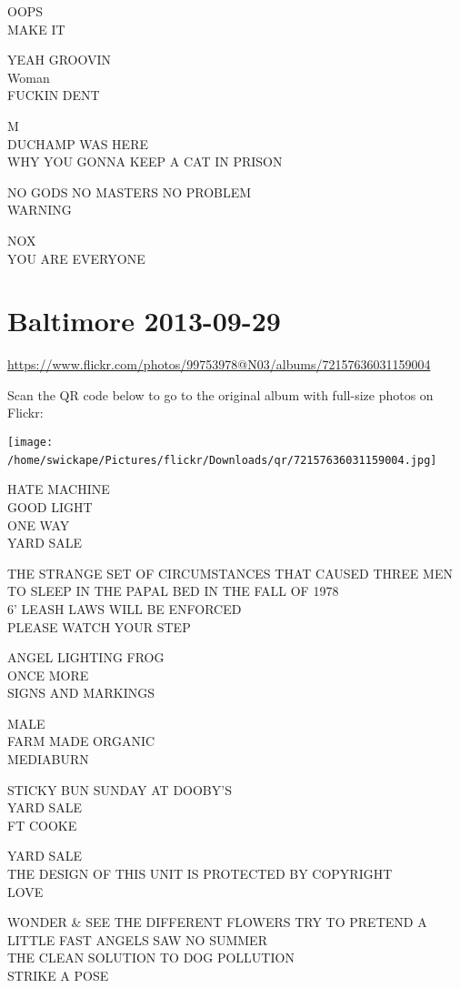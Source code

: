 \documentclass[10pt,letterpaper]{article}
\begin{document}
OOPS\\
MAKE IT

YEAH GROOVIN\\
Woman\\
FUCKIN DENT

M\\
DUCHAMP WAS HERE\\
WHY YOU GONNA KEEP A CAT IN PRISON

NO GODS NO MASTERS NO PROBLEM\\
WARNING

NOX\\
YOU ARE EVERYONE
\

\section*{Baltimore 2013-09-29}

\url{https://www.flickr.com/photos/99753978@N03/albums/72157636031159004}

Scan the QR code below to go to the original album with full-size photos on Flickr:

\texttt{[image: /home/swickape/Pictures/flickr/Downloads/qr/72157636031159004.jpg]}
\

HATE MACHINE\\
GOOD LIGHT\\
ONE WAY\\
YARD SALE

THE STRANGE SET OF CIRCUMSTANCES THAT CAUSED THREE MEN TO SLEEP IN THE PAPAL BED IN THE FALL OF 1978\\
6' LEASH LAWS WILL BE ENFORCED\\
PLEASE WATCH YOUR STEP

ANGEL LIGHTING FROG\\
ONCE MORE\\
SIGNS AND MARKINGS

MALE\\
FARM MADE ORGANIC\\
MEDIABURN

STICKY BUN SUNDAY AT DOOBY'S\\
YARD SALE\\
FT COOKE

YARD SALE\\
THE DESIGN OF THIS UNIT IS PROTECTED BY COPYRIGHT\\
LOVE

WONDER \& SEE THE DIFFERENT FLOWERS TRY TO PRETEND A LITTLE FAST ANGELS SAW NO SUMMER\\
THE CLEAN SOLUTION TO DOG POLLUTION\\
STRIKE A POSE
\end{document}
